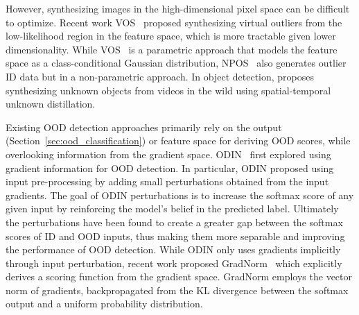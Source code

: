 However, synthesizing images in the high-dimensional pixel space can be difficult to
optimize. 
Recent work VOS~ proposed synthesizing virtual outliers from the low-likelihood region in the feature space, which is more tractable given lower dimensionality. 
While VOS~ is a parametric approach that models the feature space as a class-conditional Gaussian distribution, NPOS~ also generates outlier ID data but in a non-parametric approach. 
In object detection,  proposes synthesizing unknown objects from videos in the wild using spatial-temporal unknown distillation.

\label{sec:ood_gradient}
Existing OOD detection approaches primarily rely on the output (Section~\ref{sec:ood_classification}) or feature space for deriving OOD scores, while overlooking information from the gradient space. ODIN~ first explored using gradient information for OOD detection. In particular, ODIN proposed using input pre-processing by adding small perturbations obtained from the input gradients. The goal of ODIN perturbations is to increase the softmax score of any given input by reinforcing the model's belief in the predicted label. Ultimately the perturbations have been found to create a greater gap between the softmax scores of ID and OOD inputs, thus making them more separable and improving the performance of OOD detection. While ODIN only uses gradients {implicitly} through input perturbation, recent work proposed GradNorm~ which explicitly derives a scoring function from the {gradient space}. GradNorm employs the vector norm of gradients, backpropagated from the KL divergence between the softmax output and a uniform probability distribution.

